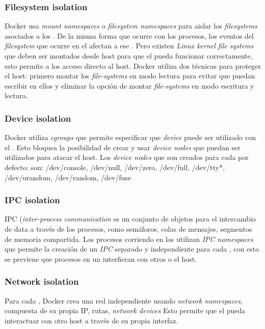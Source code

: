 \documentclass[letter,10pt]{article}
\begin{document}
	\subsubsection{Filesystem isolation}
	
	Docker usa \emph{mount namespaces} o \emph{filesystem namespaces} para aislar los \emph{filesystems} asociados a los \containers. De la misma forma que ocurre con los procesos, los eventos del \emph{filesystem} que ocurre en el \container afectan a ese \container.
	Pero existen \emph{Linux kernel file systems} que deben ser montados desde host para que el \container pueda funcionar correctamente, esto permite a los \containers acceso directo al host. Docker utiliza dos técnicas para proteger el host: primero montar los \emph{file-systems} en modo lectura para evitar que puedan escribir en ellos y eliminar la opción de montar \emph{file-systems} en modo escritura y lectura. \cite{walsh:2014:Online}
	
	\subsubsection{Device isolation}
	Docker utiliza \emph{cgroups} que permite especificar que \emph{device} puede ser utilizado con el \container. Esto bloquea la posibilidad de crear y usar \emph{device nodes} que puedan ser utilizados para atacar el host. Los \emph{device nodes} que son creados para cada \container por defecto: son: /dev/console, /dev/null, /dev/zero, /dev/full, /dev/tty*, /dev/urandom, /dev/random, /dev/fuse \cite{walsh:2014:Online}
	
	\subsubsection{IPC isolation}
	IPC (\emph{inter-process communication} es un conjunto de objetos para el intercambio de data a través de los procesos, como semáforos, colas de mensajes, segmentos de memoria compartida. Los procesos corriendo en los \containers utilizan \emph{IPC namespaces} que permite la creación de un \emph{IPC} separado y independiente para cada \container, con esto se previene que procesos en un \container interfieran con otros \containers o el host.
	
		
	\subsubsection{Network isolation}
	Para cada \container, Docker crea una red independiente usando \emph{network namespaces}, compuesta de su propia IP, rutas, \emph{network devices} Esto permite que el \container pueda interactuar con otro host a través de su propia interfaz.
\end{document}
